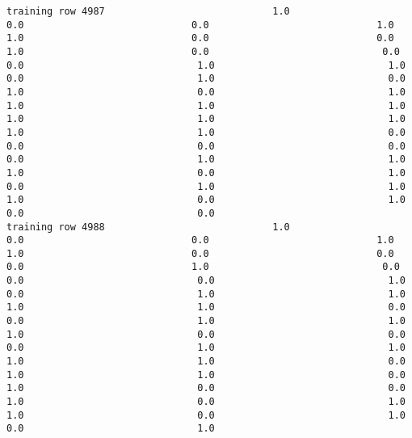 \documentclass[11pt]{article}
\begin{document}
\begin{verbatim}
training row 4987                             1.0                             0.0                             0.0                             1.0                             1.0                             0.0                             0.0                             1.0                             0.0                              0.0                              0.0                              1.0                              1.0                              0.0                              1.0                              0.0                              1.0                              0.0                              1.0                              1.0                              1.0                              1.0                              1.0                              1.0                              1.0                              1.0                              1.0                              0.0                              0.0                              0.0                              0.0                              0.0                              1.0                              1.0                              1.0                              0.0                              1.0                              0.0                              1.0                              1.0                              1.0                              0.0                              1.0                              0.0                              0.0
training row 4988                             1.0                             0.0                             0.0                             1.0                             1.0                             0.0                             0.0                             0.0                             1.0                              0.0                              0.0                              0.0                              1.0                              0.0                              1.0                              1.0                              1.0                              1.0                              0.0                              0.0                              1.0                              1.0                              1.0                              0.0                              0.0                              0.0                              1.0                              1.0                              1.0                              1.0                              0.0                              1.0                              1.0                              0.0                              1.0                              0.0                              0.0                              1.0                              0.0                              1.0                              1.0                              0.0                              1.0                              0.0                              1.0

\end{verbatim}
\end{document}
